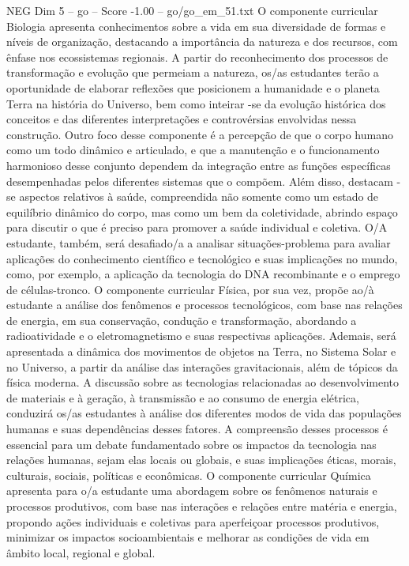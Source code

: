\begin{textsample}{NEG Dim 5 – go – Score -1.00 – go/go\_em\_51.txt}
O componente curricular Biologia apresenta conhecimentos sobre a vida em sua diversidade de formas e níveis de organização, destacando a importância da natureza e dos recursos, com ênfase nos ecossistemas regionais.
A partir do reconhecimento dos processos de transformação e evolução que permeiam a natureza, os/as estudantes terão a oportunidade de elaborar reflexões que posicionem a humanidade e o planeta Terra na história do Universo, bem como inteirar -se da evolução histórica dos conceitos e das diferentes interpretações e controvérsias envolvidas nessa construção.
Outro foco desse componente é a percepção de que o corpo humano como um todo dinâmico e articulado, e que a manutenção e o funcionamento harmonioso desse conjunto dependem da integração entre as funções específicas desempenhadas pelos diferentes sistemas que o compõem.
Além disso, destacam -se aspectos relativos à saúde, compreendida não somente como um estado de equilíbrio dinâmico do corpo, mas como um bem da coletividade, abrindo espaço para discutir o que é preciso para promover a saúde individual e coletiva.
O/A estudante, também, será desafiado/a a analisar situações-problema para avaliar aplicações do conhecimento científico e tecnológico e suas implicações no mundo, como, por exemplo, a aplicação da tecnologia do DNA recombinante e o emprego de células-tronco.
O componente curricular Física, por sua vez, propõe ao/à estudante a análise dos fenômenos e processos tecnológicos, com base nas relações de energia, em sua conservação, condução e transformação, abordando a radioatividade e o eletromagnetismo e suas respectivas aplicações.
Ademais, será apresentada a dinâmica dos movimentos de objetos na Terra, no Sistema Solar e no Universo, a partir da análise das interações gravitacionais, além de tópicos da física moderna.
A discussão sobre as tecnologias relacionadas ao desenvolvimento de materiais e à geração, à transmissão e ao consumo de energia elétrica, conduzirá os/as estudantes à análise dos diferentes modos de vida das populações humanas e suas dependências desses fatores.
A compreensão desses processos é essencial para um debate fundamentado sobre os impactos da tecnologia nas relações humanas, sejam elas locais ou globais, e suas implicações éticas, morais, culturais, sociais, políticas e econômicas.
O componente curricular Química apresenta para o/a estudante uma abordagem sobre os fenômenos naturais e processos produtivos, com base nas interações e relações entre matéria e energia, propondo ações individuais e coletivas para aperfeiçoar processos produtivos, minimizar os impactos socioambientais e melhorar as condições de vida em âmbito local, regional e global.

\end{textsample}
